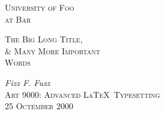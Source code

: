 \documentclass[letterpaper,titlepage,12pt]{article} %
\begin{document}
\begin{titlepage}
	\centering
	{\scshape\Large University of Foo \\ at Bar\par}
	\vspace{5cm}
	{\scshape\LARGE The Big Long Title,\\ \& Many More Important\\ Words\par}
	\vfill
	{\Large\itshape Fizz F. Fuzz\\}
	{\Large\scshape Art 9000: Advanced \LaTeX ~Typesetting\\}
	{\Large\scshape 25 Octember 2000\\}

\vspace{5cm}
\end{titlepage}

\begin{titlepage}
    \tableofcontents
    \listoffigures
\end{titlepage}





\newpage
{}
\printbibliography[heading=none]
\end{document}
